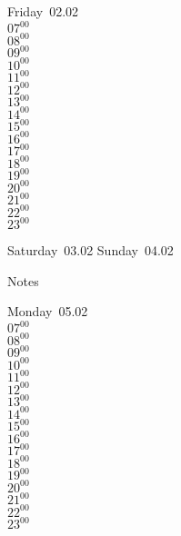 \documentclass[11pt, a4paper]{book}\usepackage[]{graphicx}\usepackage[]{color}
\begin{document}
\begin{weekdaybox}
  Friday~02.02\\
  { 
  \vfill
  $07^{00}$\\
$08^{00}$\\
$09^{00}$\\
$10^{00}$\\
$11^{00}$\\
$12^{00}$\\
$13^{00}$\\
$14^{00}$\\
$15^{00}$\\
$16^{00}$\\
$17^{00}$\\
$18^{00}$\\
$19^{00}$\\
$20^{00}$\\
$21^{00}$\\
$22^{00}$\\
$23^{00}$\\
  }
\end{weekdaybox}
\begin{weekendbox}
  Saturday~03.02
  \tcblower
  Sunday~04.02
\end{weekendbox} %
\begin{notebox}
  Notes
\end{notebox}
\clearpage
\begin{headerbox}
\end{headerbox}
\begin{weekdaybox}
  Monday~05.02\\
  { 
  \vfill
  $07^{00}$\\
$08^{00}$\\
$09^{00}$\\
$10^{00}$\\
$11^{00}$\\
$12^{00}$\\
$13^{00}$\\
$14^{00}$\\
$15^{00}$\\
$16^{00}$\\
$17^{00}$\\
$18^{00}$\\
$19^{00}$\\
$20^{00}$\\
$21^{00}$\\
$22^{00}$\\
$23^{00}$\\
  }
\end{weekdaybox}
\end{document}
